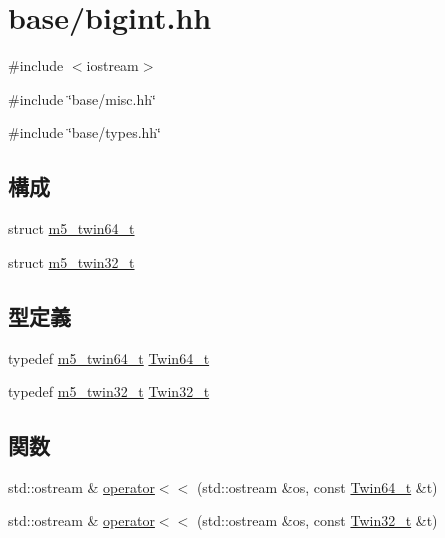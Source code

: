 \hypertarget{bigint_8hh}{
\section{base/bigint.hh}
\label{bigint_8hh}
}
{\ttfamily \#include $<$iostream$>$}\par
{\ttfamily \#include \char`\"{}base/misc.hh\char`\"{}}\par
{\ttfamily \#include \char`\"{}base/types.hh\char`\"{}}\par
\subsection*{構成}
\begin{DoxyCompactItemize}
\item 
struct \hyperlink{structm5__twin64__t}{m5\_\-twin64\_\-t}
\item 
struct \hyperlink{structm5__twin32__t}{m5\_\-twin32\_\-t}
\end{DoxyCompactItemize}
\subsection*{型定義}
\begin{DoxyCompactItemize}
\item 
typedef \hyperlink{structm5__twin64__t}{m5\_\-twin64\_\-t} \hyperlink{bigint_8hh_acc3b3456cd2776632d23e48120b92340}{Twin64\_\-t}
\item 
typedef \hyperlink{structm5__twin32__t}{m5\_\-twin32\_\-t} \hyperlink{bigint_8hh_aa39b720d8af8a78928ec479c910b033e}{Twin32\_\-t}
\end{DoxyCompactItemize}
\subsection*{関数}
\begin{DoxyCompactItemize}
\item 
std::ostream \& \hyperlink{bigint_8hh_a0a453be4058291f0248dd92a1cc4cff3}{operator$<$$<$} (std::ostream \&os, const \hyperlink{structm5__twin64__t}{Twin64\_\-t} \&t)
\item 
std::ostream \& \hyperlink{bigint_8hh_a595f9eddd135397efcd8bfdf262e206c}{operator$<$$<$} (std::ostream \&os, const \hyperlink{structm5__twin32__t}{Twin32\_\-t} \&t)
\end{DoxyCompactItemize}


